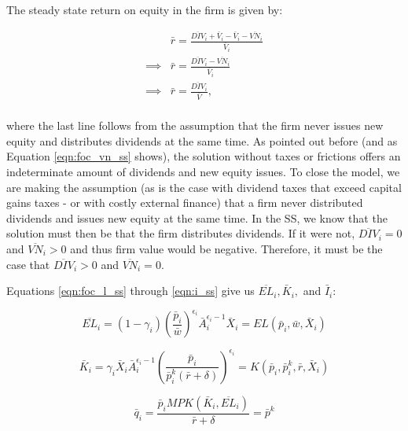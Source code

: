\documentclass[letterpaper,12pt]{article}
\theoremstyle{definition}
\begin{document}
\begin{spacing}{1.5}
The steady state return on equity in the firm is given by:

\begin{equation}
\label{eqn:ss_return}
\begin{split}
& \bar{r} = \frac{\overline{DIV}_{i}+\bar{V}_{i}-\bar{V}_{i}-\overline{VN}_{i}}{\bar{V}_{i}}\\
\implies & \bar{r} =  \frac{\overline{DIV}_{i}-\overline{VN}_{i}}{\bar{V}_{i}}\\
\implies & \bar{r} =  \frac{\overline{DIV}_{i}}{\bar{V}},\\
\end{split}
\end{equation}

\noindent\noindent where the last line follows from the assumption that the firm never issues new equity and distributes dividends at the same time.  As pointed out before (and as Equation \ref{eqn:foc_vn_ss} shows), the solution without taxes or frictions offers an indeterminate amount of dividends and new equity issues.  To close the model, we are making the assumption (as is the case with dividend taxes that exceed capital gains taxes - or with costly external finance) that a firm never distributed dividends and issues new equity at the same time.  In the SS, we know that the solution must then be that the firm distributes dividends.  If it were not, $\overline{DIV}_{i}=0$ and $\overline{VN}_{i}>0$ and thus firm value would be negative.  Therefore, it must be the case that $\overline{DIV}_{i}>0$ and $\overline{VN}_{i}=0$.

Equations \ref{eqn:foc_l_ss} through \ref{eqn:i_ss} give us $\overline{EL}_{i}, \bar{K}_{i},$ and $\bar{I}_{i}$:

\begin{equation}
\label{eqn:l_ss}
\overline{EL}_{i} = (1-\gamma_{i}) \left( \frac{ \bar{p}_{i}}{\bar{w}}\right)^{\epsilon_{i}}\bar{A}_{i}^{\epsilon_{i}-1}\bar{X}_{i} = EL(\bar{p}_{i},\bar{w},\bar{X}_{i})
\end{equation}

\begin{equation}
\label{eqn:k_ss}
\bar{K}_{i} = \gamma_{i}\bar{X}_{i}\bar{A}_{i}^{\epsilon_{i}-1} \left(\frac{\bar{p}_{i}}{\bar{p}^{k}_{i}(\bar{r}+\delta)} \right)^{\epsilon_{i}} = K(\bar{p}_{i},\bar{p}^{k}_{i},\bar{r},\bar{X}_{i})
\end{equation}

\begin{equation}
\label{eqn:q_ss}
\bar{q}_{i} = \frac{\bar{p}_{i}MPK(\bar{K}_{i},\overline{EL}_{i})}{\bar{r}+\delta}=\bar{p}^{k}
\end{equation}


\end{spacing}
\end{document}
